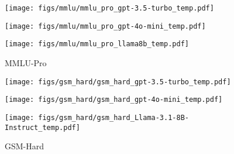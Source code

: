 \begin{figure*}[ht]
    \centering
    
    \begin{subfigure}[t]%
        \centering
        \begin{minipage}{0.32\textwidth}
            \centering
            \texttt{[image: figs/mmlu/mmlu\_pro\_gpt-3.5-turbo\_temp.pdf]}
        \end{minipage}
        \begin{minipage}{0.32\textwidth}
            \centering
            \texttt{[image: figs/mmlu/mmlu\_pro\_gpt-4o-mini\_temp.pdf]}
        \end{minipage}
        \begin{minipage}{0.32\textwidth}
            \centering
            \texttt{[image: figs/mmlu/mmlu\_pro\_llama8b\_temp.pdf]}
        \end{minipage}
        {\footnotesize MMLU-Pro} %
    \end{subfigure}
    
    \begin{subfigure}%
        \centering
        \begin{minipage}{0.32\textwidth}
            \centering
            \texttt{[image: figs/gsm\_hard/gsm\_hard\_gpt-3.5-turbo\_temp.pdf]}
        \end{minipage}
        \begin{minipage}{0.32\textwidth}
            \centering
            \texttt{[image: figs/gsm\_hard/gsm\_hard\_gpt-4o-mini\_temp.pdf]}
        \end{minipage}
        \begin{minipage}{0.32\textwidth}
            \centering
            \texttt{[image: figs/gsm\_hard/gsm\_hard\_Llama-3.1-8B-Instruct\_temp.pdf]}
        \end{minipage}
        {\footnotesize GSM-Hard}
    \end{subfigure}
    

\end{figure*}
